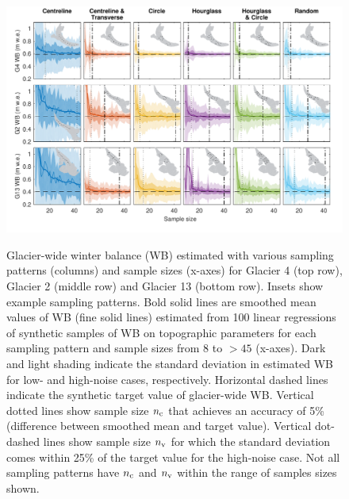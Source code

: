 \documentclass{article}
\begin{document}
\begin{figure}
	\centering
	\includegraphics[width =\textwidth]{Pulwicki_Fig3.pdf}\\
	\caption{Glacier-wide winter balance (WB) estimated with various sampling patterns (columns) and sample sizes (x-axes) for Glacier 4 (top row), Glacier 2 (middle row) and Glacier 13 (bottom row). Insets show example sampling patterns. Bold solid lines are smoothed mean values of WB  (fine solid lines) estimated from 100 linear regressions of synthetic samples of WB on topographic parameters for each sampling pattern and sample sizes from 8 to $> 45$ (x-axes). Dark and light shading indicate the standard deviation in estimated WB for low- and high-noise cases, respectively. Horizontal dashed lines indicate the synthetic target value of glacier-wide WB. Vertical dotted lines show sample size $n_{\rm c}$ that achieves an accuracy of 5\% (difference between smoothed mean and target value). Vertical dot-dashed lines show sample size $n_{\rm v}$ for which the standard deviation comes within 25\% of the target value for the high-noise case. Not all sampling patterns have $n_{\rm c}$ and $n_{\rm v}$ within the range of samples sizes shown.}
	\label{fig:SyntheticObsWB}
\end{figure}
\end{document}
